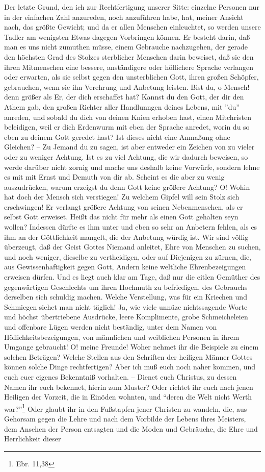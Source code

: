 Der letzte Grund, den ich zur Rechtfertigung unserer Sitte: einzelne Personen nur in der einfachen Zahl anzureden, noch anzuführen habe, hat, meiner Ansicht nach, das größte Gewicht; und da er allen Menschen einleuchtet, so werden unsere Tadler am wenigsten Etwas dagegen Vorbringen können. Er besteht darin, daß man es uns nicht zumuthen müsse, einem Gebrauche nachzugehen, der gerade den höchsten Grad des Stolzes sterblicher Menschen darin beweiset, daß sie den ihren Mitmenschen eine bessere, anständigere oder höflichere Sprache verlangen oder erwarten, als sie selbst gegen den unsterblichen Gott, ihren großen Schöpfer, gebrauchen, wenn sie ihn Verehrung und Anbetung leisten. Bist du, o Mensch! denn größer als Er, der dich erschaffet hat? Kannst du den Gott, der dir den Athem gab, den großen Richter aller Handlunngen deines Lebens, mit ''du'' anreden, und sobald du dich von deinen Knien erhoben hast, einen Mitchristen beleidigen, weil er dich Erdenwurm mit eben der Sprache anredet, worin du so eben zu deinem Gott geredet hast? Ist dieses nicht eine Anmaßung ohne Gleichen? -- Zu Jemand du zu sagen, ist aber entweder ein Zeichen von zu vieler oder zu weniger Achtung. Ist es zu viel Achtung, die wir dadurch beweisen, so werde darüber nicht zornig und mache uns deshalb keine Vorwürfe, sondern lehne es mit mit Ernst und Demuth von dir ab. Scheint es die aber zu wenig auszudrücken, warum erzeigst du denn Gott keine größere Achtung? O! Wohin hat doch der Mensch sich verstiegen! Zu welchem Gipfel will sein Stolz sich erschwingen! Er verlangt größere Achtung von seinen Nebenmenschen, als er selbst Gott erweiset. Heißt das nicht für mehr als einen Gott gehalten seyn wollen? Indessen dürfte es ihm unter und eben so sehr an Anbetern fehlen, als es ihm an der Göttlichkeit mangelt, die der Anbetung würdig ist. Wir sind völlig überzeugt, daß der Geist Gottes Niemand anleitet, Ehre von Menschen zu suchen, und noch weniger, dieselbe zu vertheidigen, oder auf Diejenigen zu zürnen, die, aus Gewissenhaftigkeit gegen Gott, Andern keine weltliche Ehrenbezeigungen erweisen dürfen. Und es liegt auch klar am Tage, daß nur die eitlen Gemüther des gegenwärtigen Geschlechts um ihren Hochmuth zu befriedigen, des Gebrauchs derselben sich schuldig machen. Welche Verstellung, was für ein Kriechen und Schmiegen siehet man nicht täglich! Ja, wie viele unnüze nichtssagende Worte und höchst übertriebene Ausdrücke, leere Komplimente, grobe Schmeicheleien und offenbare Lügen werden nicht beständig, unter dem Namen von Höflichkeitsbezeigungen, von männlichen und weiblichen Personen in ihrem Umgange gebraucht! O! meine Freunde! Woher nehmet ihr die Beispiele zu einem solchen Beträgen? Welche Stellen aus den Schriften der heiligen Männer Gottes können solche Dinge rechtfertigen? Aber ich muß euch noch naher kommen, und euch euer eigenes Bekenntniß vorhalten. -- Dienet euch Christus, zu dessen Namen ihr euch bekennet, hierin zum Muster? Oder richtet ihr euch nach jenen Heiligen der Vorzeit, die in Einöden wohnten, und "`deren die Welt nicht Werth war?"'\footnote{Ebr. 11,38} Oder glaubt ihr in den Fußstapfen jener Christen zu wandeln, die, aus Gehorsam gegen die Lehre und nach dem Vorbilde der Lebens ihres Meisters, dem Ansehen der Person entsagten und die Moden und Gebräuche, die Ehre und Herrlichkeit dieser 